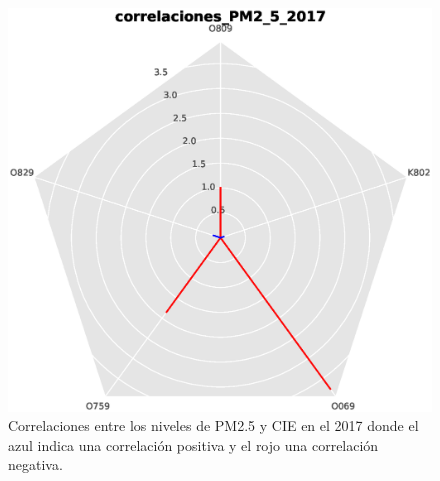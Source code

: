 \begin{figure}[h!]
\setcounter{figure}{5} %
\captionsetup{type=figure} %
\begin{center}
   \includegraphics[trim=0 0 0 23,clip,width=1\textwidth]{spiderweb_correlaciones_PM2_5_2017}
   \end{center}
    \caption[Correlaciones 2017 PM2.5]{Correlaciones entre los niveles de PM2.5 y CIE en el 2017 donde el azul indica una correlación positiva y el rojo una correlación negativa.}
    \label{correlaciones_2017_PM25}
\end{figure}

